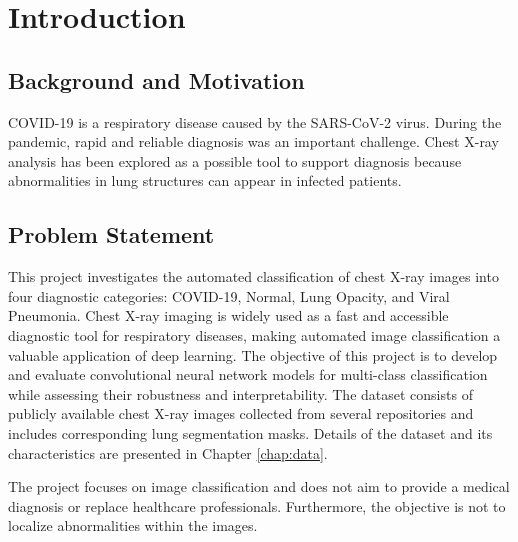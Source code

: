 \chapter{Introduction}
\section{Background and Motivation}
COVID-19 is a respiratory disease caused by the SARS-CoV-2 virus. During the pandemic, rapid and reliable diagnosis was an important challenge. Chest X-ray analysis has been explored as a possible tool to support diagnosis because abnormalities in lung structures can appear in infected patients. 

\section{Problem Statement}
This project investigates the automated classification of chest X-ray images into four diagnostic categories: COVID-19, Normal, Lung Opacity, and Viral Pneumonia. Chest X-ray imaging is widely used as a fast and accessible diagnostic tool for respiratory diseases, making automated image classification a valuable application of deep learning. The objective of this project is to develop and evaluate convolutional neural network models for multi-class classification while assessing their robustness and interpretability. The dataset consists of publicly available chest X-ray images collected from several repositories and includes corresponding lung segmentation masks. Details of the dataset and its characteristics are presented in Chapter \ref{chap:data}.

The project focuses on image classification and does not aim to provide a medical diagnosis or replace healthcare professionals. Furthermore, the objective is not to localize abnormalities within the images.







